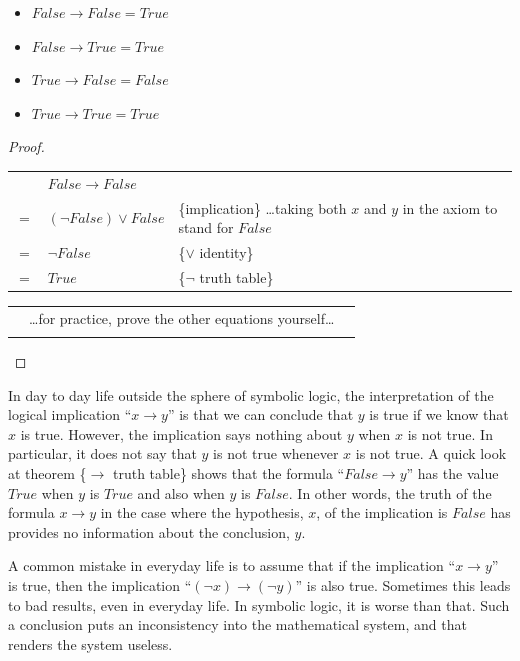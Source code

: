 \begin{theorem}
\label{implication-truth-table}
\mbox{}
\begin{itemize}
\item $False \rightarrow False = True$
\item $False \rightarrow True  = True$
\item $True  \rightarrow False = False$
\item $True  \rightarrow True  = True$
\end{itemize}
\end{theorem}

\begin{proof}
\mbox{} \\
\begin{tabular}{llp{3.15in}}
    & $False \rightarrow False$        & \\
$=$ & $(\neg False) \vee False$        & \{implication\} \dots taking both $x$ and $y$ in the axiom to stand for $False$ \\
$=$ & $\neg False$                     & \{$\vee$ identity\}\\
$=$ & $True$                           & \{$\neg$ truth table\}\\
\end{tabular}

\begin{tabular}{lll}
& \dots for practice, prove the other equations yourself\dots & \\         & \\
\end{tabular}

\end{proof}

In day to day life outside the sphere of symbolic logic,
the interpretation of the logical implication ``$x \rightarrow y$''
is that we can conclude that $y$ is true if we know that
$x$ is true. However, the implication says nothing
about $y$ when $x$ is not true. In particular, it
does not say that $y$ is not true whenever $x$ is not true.
A quick look at theorem \{$\rightarrow$ truth table\} shows that the
formula ``$False \rightarrow y$'' has the value $True$ when $y$ is $True$
and also when $y$ is $False$.
In other words, the truth of the formula $x \rightarrow y$ in the case
where the hypothesis, $x$, of the implication is $False$ has provides
no information about the conclusion, $y$.

A common mistake in everyday life is to assume that if the
implication ``$x \rightarrow y$'' is true, then the implication
``$(\neg x) \rightarrow (\neg y)$''
is also true. Sometimes this leads to bad
results, even in everyday life. In symbolic logic,
it is worse than that. Such a conclusion puts an
inconsistency into the mathematical system, and that renders the system useless.


